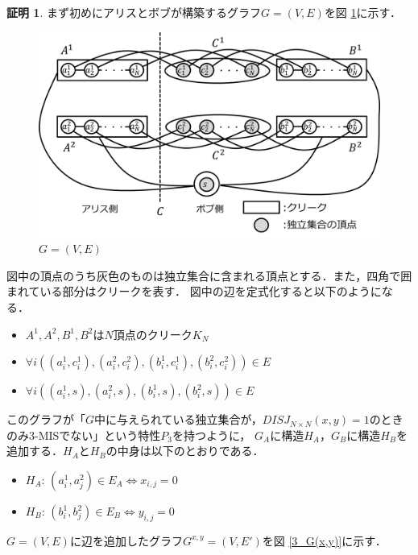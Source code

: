 \documentclass[12pt]{thesis}
\theoremstyle{definition}
\newtheorem*{prf*}{証明}
\begin{document}
\begin{prf*}
まず初めにアリスとボブが構築するグラフ$G = (V, E)$を図 \ref{3_G}に示す．

\begin{figure}[ht]
\begin{center}
\includegraphics[width=120mm]{3_G.png}
\end{center}
\caption{$G = (V, E)$}
\label{3_G}
\end{figure}

図中の頂点のうち灰色のものは独立集合に含まれる頂点とする．また，四角で囲まれている部分はクリークを表す．
図中の辺を定式化すると以下のようになる．
\begin{itemize}
\item $A^{1}, A^{2}, B^{1}, B^{2}$は$N$頂点のクリーク$K_{N}$
\item $\forall i((a_{i}^{1}, c_{i}^{1}), (a_{i}^{2}, c_{i}^{2}), (b_{i}^{1}, c_{i}^{1}), (b_{i}^{2}, c_{i}^{2})) \in E$
\item $\forall i((a_{i}^{1}, s), (a_{i}^{2}, s), (b_{i}^{1}, s), (b_{i}^{2}, s)) \in E$
\end{itemize}

このグラフが「$G$中に与えられている独立集合が，$DISJ_{N \times N} (x, y) = 1$のときのみ3-MISでない」という特性$P_{3}$を持つように，
$G_{A}$に構造$H_{A}$，$G_{B}$に構造$H_{B}$を追加する．$H_{A}$と$H_{B}$の中身は以下のとおりである．
\newpage
\begin{itemize}
\item $H_{A}$: $(a_{i}^{1}, a_{j}^{2}) \in E_{A} \Leftrightarrow x_{i, j} = 0$
\item $H_{B}$: $(b_{i}^{1}, b_{j}^{2}) \in E_{B} \Leftrightarrow y_{i, j} = 0$
\end{itemize}

$G = (V, E)$に辺を追加したグラフ$G^{x, y} = (V, E')$を図 \ref{3_G(x,y)}に示す．


\end{prf*}
\end{document}
